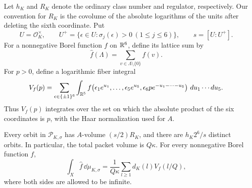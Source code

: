 Let $h_K$ and $R_K$ denote the ordinary class number and regulator,
respectively.  Our convention for $R_K$ is the covolume of the absolute
logarithms of the units after deleting the sixth coordinate.  Put
\[
 U=\mathcal O_K^\times,\qquad
 U^+=\{\epsilon\in U:\sigma_j(\epsilon)>0\ (1\le j\le6)\},
 \qquad s=[U:U^+].
\]
For a nonnegative Borel function $f$ on $\mathbb R^6$, define its lattice sum by
\[
 \widehat f(\Lambda)=\sum_{v\in\Lambda\setminus\{0\}}f(v).
\]
For $p>0$, define a logarithmic fiber integral
\begin{align}
 V_f(p)
  =\sum_{\epsilon\in\{\pm1\}^6}\int_{\mathbb R^5}
  f\bigl(\epsilon_1e^{u_1},\ldots,\epsilon_5e^{u_5},
     \epsilon_6p e^{-u_1-\cdots-u_5}\bigr)
       \,\mathop{}\!d u_1\cdots\mathop{}\!d u_5 .                 \label{eq:fiber-integral}
\end{align}
Thus $V_f(p)$ integrates over the set on which the absolute product of
the six coordinates is $p$, with the Haar normalization used for $A$.

\begin{proposition}
\label{prop:packet-volume}
Every orbit in $\mathcal P_{K,\sigma}$ has $A$-volume $(s/2)R_K$,
and there are $h_K2^6/s$ distinct orbits.  In particular, the total
packet volume is $Q\kappa$.  For every nonnegative Borel function $f$,
\begin{equation}
 \int_X\widehat f\,\dd\mu_{K,\sigma}
   =\frac1{Q\kappa}\sum_{l\ge1}d_K(l)V_f(l/Q),
                                                        \label{eq:vector-unfolding}
\end{equation}
where both sides are allowed to be infinite.
\end{proposition}

